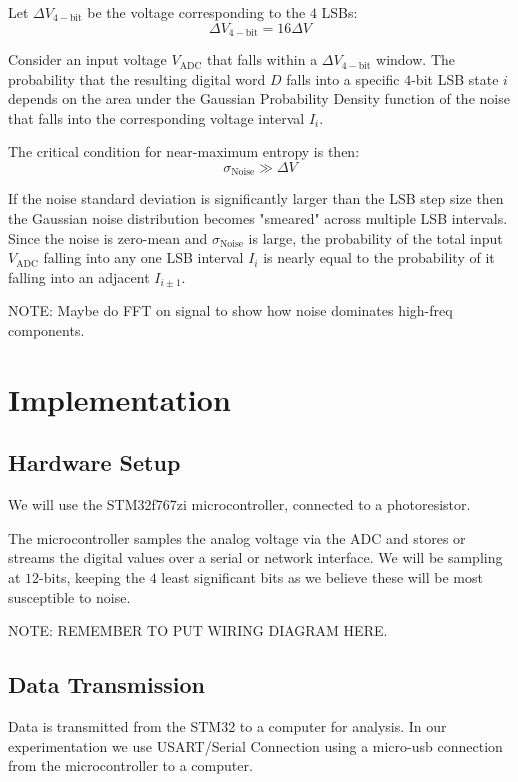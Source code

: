 Let \(\Delta V_{4-\text{bit}}\) be the voltage corresponding to 
the \(4\) LSBs: 
\[ 
    \Delta V_{4-\text{bit}} = 16\Delta V
\]

Consider an input voltage \(V_{\text{ADC}}\) that falls within 
a \(\Delta V_{4-\text{bit}}\) window. The probability that 
the resulting digital word \(D\) falls into a specific \(4\)-bit 
LSB state \(i\) depends on the area under the Gaussian Probability 
Density function of the noise that falls into the corresponding 
voltage interval \(I_i\). 

The critical condition for near-maximum entropy is then: 
\[ 
    \sigma_{\text{Noise}} \gg \Delta V
\]

If the noise standard deviation is significantly larger than 
the LSB step size then the Gaussian noise distribution becomes 
"smeared" across multiple LSB intervals. Since the noise is 
zero-mean and \(\sigma_{\text{Noise}}\) is large, the probability 
of the total input \(V_{\text{ADC}}\) falling into any one 
LSB interval \(I_i\) is nearly equal to the probability of 
it falling into an adjacent \(I_{i \pm 1}\). 

NOTE: Maybe do FFT on signal to show how noise dominates high-freq 
components.


\newpage
\section{Implementation}
\subsection{Hardware Setup}
We will use the STM32f767zi microcontroller, connected to a 
photoresistor.

The microcontroller samples the analog voltage via the ADC and 
stores or 
streams the digital values over a serial or network interface.
We will be sampling at \(12\)-bits, keeping the \(4\) least 
significant bits as we believe these will be most susceptible to 
noise.

NOTE: REMEMBER TO PUT WIRING DIAGRAM HERE.

\subsection{Data Transmission}
Data is transmitted from the STM32 to a computer for analysis. 
In our experimentation we use USART/Serial Connection using 
a micro-usb connection from the microcontroller to a computer.

